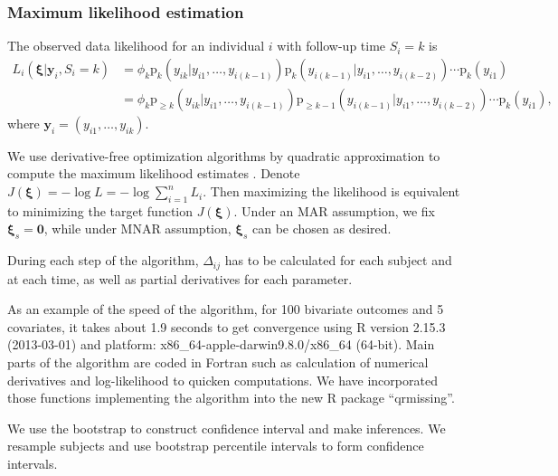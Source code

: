 \documentclass[useAMS,usenatbib,referee]{biom}
\newcommand{\pr}{\mbox{p}}
\begin{document}
\subsubsection{Maximum likelihood estimation}
\label{ch3:sec:mle}

The observed data likelihood for an individual $i$ with follow-up time
$S_i = k$ is
\begin{align} \label{eq:ll} L_i(\bm \xi| \bm y_i, S_{i} = k) & =
  \phi_k\pr_k (y_{ik} | y_{i1}, \ldots, y_{i(k-1)})
  \pr_k (y_{i(k-1)}|y_{i1}, \ldots, y_{i(k-2)}) \cdots \pr_{k} (y_{i1}) \\
  & = \phi_k \pr_{\geq k} (y_{ik} | y_{i1}, \ldots, y_{i(k-1)}) \pr_{\geq k-1}
  (y_{i(k-1)}|y_{i1}, \ldots, y_{i(k-2)}) \cdots \pr_{k} (y_{i1}), \nonumber
\end{align}
where $\bm y_i = (y_{i1}, \ldots, y_{ik})$.

We use derivative-free optimization algorithms by quadratic
approximation to compute the maximum likelihood estimates
\citep{minqa}. Denote $J(\bm \xi) = - \log L = - \log \sum_{i =
  1}^n L_i$.  Then maximizing the likelihood is equivalent to minimizing
the target function $J(\bm \xi)$. Under an MAR assumption, we fix
$\bm \xi_s = \bm 0$, while under MNAR assumption, $\bm \xi_s
$ can be chosen as desired.

During each step of the algorithm, $\Delta_{ij}$ has to be calculated
for each subject and at each time, as well as partial derivatives for
each parameter.

As an example of the speed of the algorithm, for 100 bivariate
outcomes and 5 covariates, it takes about 1.9 seconds to get
convergence using R version 2.15.3 (2013-03-01) \citep{R} and
platform: x86\_64-apple-darwin9.8.0/x86\_64 (64-bit). Main parts of
the algorithm are coded in Fortran such as calculation of numerical
derivatives and log-likelihood to quicken computations. We have
incorporated those functions implementing the algorithm into the new R
\citep{R} package ``qrmissing''.

We use the bootstrap \citep{efron1993} to
construct confidence interval and make inferences.  We resample
subjects and use bootstrap percentile intervals to form confidence
intervals.

\end{document}
